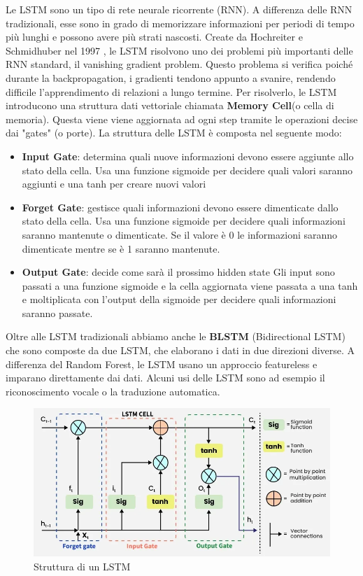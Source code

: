 \documentclass[12pt,a4paper,openright,twoside]{book}
\begin{document}
Le LSTM sono un tipo di rete neurale ricorrente (RNN). 
A differenza delle RNN tradizionali, esse sono in grado di
memorizzare informazioni per periodi di tempo più lunghi e possono
avere più strati nascosti. Create da Hochreiter e Schmidhuber nel 1997 \cite{LSTM1997},
le LSTM risolvono uno dei problemi più importanti
delle RNN standard, il vanishing gradient problem. Questo
problema si verifica poiché durante la backpropagation, i gradienti
tendono appunto a svanire, rendendo difficile l'apprendimento
di relazioni a lungo termine. 
Per risolverlo, le LSTM introducono una struttura dati vettoriale
chiamata \textbf{Memory Cell}(o cella di memoria). Questa viene
viene aggiornata ad ogni step tramite le operazioni decise dai "gates" (o porte).
La struttura delle LSTM è composta nel seguente modo:
\begin{itemize}
    \item \textbf{Input Gate}: determina quali nuove informazioni
    devono essere aggiunte allo stato della cella. Usa una funzione
    sigmoide per decidere quali valori saranno aggiunti e una tanh
    per creare nuovi valori
    \item \textbf{Forget Gate}: gestisce quali informazioni
    devono essere dimenticate dallo stato della cella. Usa una funzione
    sigmoide per decidere quali informazioni saranno mantenute o dimenticate.
    Se il valore è 0 le informazioni saranno dimenticate mentre se è 1 saranno mantenute.
    \item \textbf{Output Gate}: decide come sarà il prossimo hidden state
    Gli input sono passati a una funzione sigmoide e la cella
    aggiornata viene passata a una tanh e moltiplicata con l'output della sigmoide
    per decidere quali informazioni saranno passate.
\end{itemize}

\noindent Oltre alle LSTM tradizionali abbiamo anche le \textbf{BLSTM} (Bidirectional LSTM) che sono
composte da due LSTM, che elaborano i dati in due direzioni diverse.
A differenza del Random Forest, le LSTM usano un approccio featureless e imparano
direttamente dai dati. Alcuni usi delle LSTM sono ad esempio
il riconoscimento vocale o la traduzione automatica.

\begin{figure}[H]
    \centering
    \includegraphics[width=.8\linewidth]{figures/gate_of_lstm.png}
    \caption{Struttura di un LSTM \cite{LSTM_image}}
    \label{fig:LSTM}
\end{figure}
\end{document}
